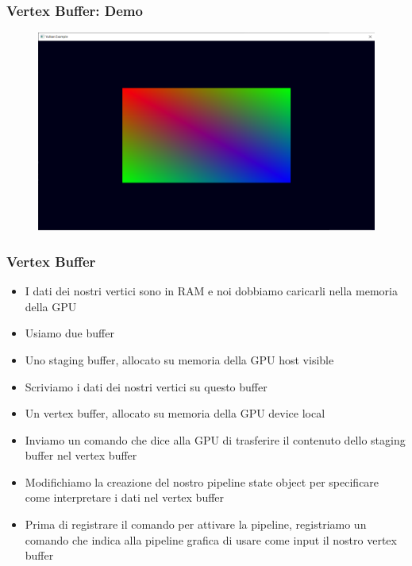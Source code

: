 \begin{frame}
\frametitle{Vertex Buffer: Demo}
\begin{figure}[ht]
    \centering
    \includegraphics[scale=0.25]{images/SlidesVertices/RenderQuad.png}
\end{figure}
\end{frame}

\begin{frame}
\frametitle{Vertex Buffer}
\begin{itemize}
\item I dati dei nostri vertici sono in RAM e noi dobbiamo caricarli nella memoria della GPU
\item Usiamo due buffer
\item Uno staging buffer, allocato su memoria della GPU host visible
\item Scriviamo i dati dei nostri vertici su questo buffer
\item Un vertex buffer, allocato su memoria della GPU device local
\item Inviamo un comando che dice alla GPU di trasferire il contenuto dello staging buffer nel vertex buffer
\item Modifichiamo la creazione del nostro pipeline state object per specificare come interpretare i dati nel vertex buffer
\item Prima di registrare il comando per attivare la pipeline, registriamo un comando che indica alla pipeline grafica di usare come input il nostro vertex buffer
\end{itemize}
\end{frame}
